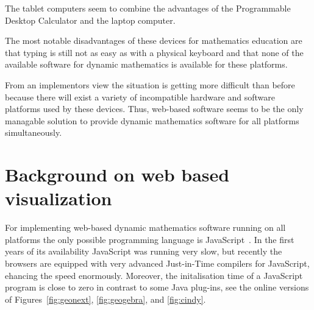 \documentclass[12pt,a4paper]{article}%
\begin{document}
The tablet computers seem to combine the advantages of the Programmable Desktop Calculator 
and the laptop computer. 

The most notable disadvantages of these devices for mathematics education are 
that typing is still not as easy 
as with a physical keyboard and that none of the available software for 
dynamic mathematics is available for these platforms.

From an implementors view the situation is getting more difficult than before because there 
will exist a variety of incompatible hardware and software platforms used by these devices. 
Thus, web-based software seems to be the only managable solution to provide 
dynamic mathematics software for all platforms simultaneously.

\section{Background on web based visualization}\label{sec:3}
For implementing  web-based dynamic mathematics software running on all platforms 
the only possible programming language is JavaScript~\cite{crockford}. In the first years of its availability
JavaScript was running very slow, but recently the browsers are equipped with very advanced
Just-in-Time compilers for JavaScript, ehancing the speed enormously. 
Moreover, the initalisation time of a 
JavaScript program is close to zero in contrast to some Java plug-ins, see the online versions of
Figures~\ref{fig:geonext}, \ref{fig:geogebra}, and \ref{fig:cindy}.
\end{document}
